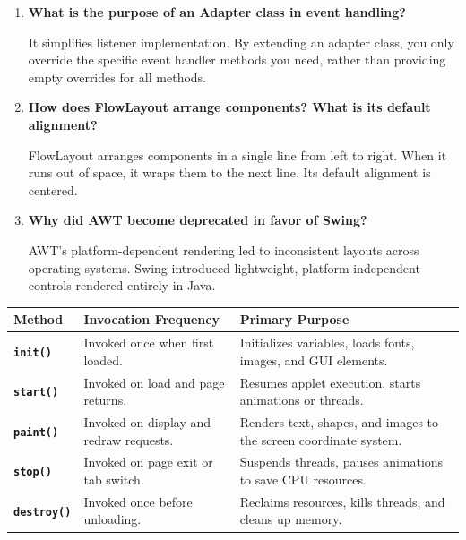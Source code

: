 \documentclass[12pt,a4paper]{article}
\newcommand{\Q}[1]{\textbf{#1}\par\noindent\ignorespaces}
\renewcommand{\arraystretch}{1.45}
\begin{document}
\begin{tcolorbox}[exambox, title={\textbf{Frequently Asked / Viva Questions}}]
\begin{enumerate}[leftmargin=*, label=\textbf{Q\arabic*.}, itemsep=5pt]
  \item \Q{What is the purpose of an Adapter class in event handling?}
        It simplifies listener implementation. By extending an adapter class, you only override the specific event handler methods you need, rather than providing empty overrides for all methods.
        
  \item \Q{How does FlowLayout arrange components? What is its default alignment?}
        FlowLayout arranges components in a single line from left to right. When it runs out of space, it wraps them to the next line. Its default alignment is centered.
        
  \item \Q{Why did AWT become deprecated in favor of Swing?}
        AWT's platform-dependent rendering led to inconsistent layouts across operating systems. Swing introduced lightweight, platform-independent controls rendered entirely in Java.
\end{enumerate}
\end{tcolorbox}

\begin{tcolorbox}[tikzbox, title={Applet Lifecycle Methods Transition Matrix}]
\centering
{\renewcommand{\arraystretch}{1.45}%
\begin{tabularx}{\linewidth}{|B{3.0cm}|Y|Y|}
\hline
\textbf{Method} & \textbf{Invocation Frequency} & \textbf{Primary Purpose} \\
\hline
\textbf{\texttt{init()}} & Invoked once when first loaded. & Initializes variables, loads fonts, images, and GUI elements. \\
\hline
\textbf{\texttt{start()}} & Invoked on load and page returns. & Resumes applet execution, starts animations or threads. \\
\hline
\textbf{\texttt{paint()}} & Invoked on display and redraw requests. & Renders text, shapes, and images to the screen coordinate system. \\
\hline
\textbf{\texttt{stop()}} & Invoked on page exit or tab switch. & Suspends threads, pauses animations to save CPU resources. \\
\hline
\textbf{\texttt{destroy()}} & Invoked once before unloading. & Reclaims resources, kills threads, and cleans up memory. \\
\hline
\end{tabularx}}
\end{tcolorbox}
\end{document}
